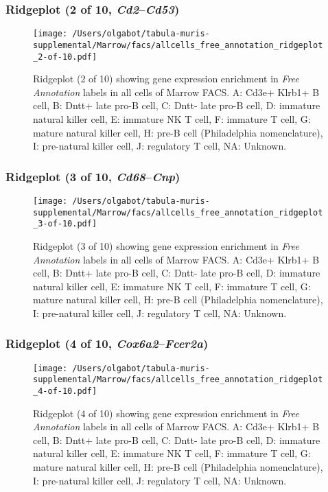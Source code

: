 \clearpage

\subsubsection{Ridgeplot (2 of 10, \emph{Cd2}--\emph{Cd53})}
\begin{figure}[h]
\centering
\texttt{[image: /Users/olgabot/tabula-muris-supplemental/Marrow/facs/allcells\_free\_annotation\_ridgeplot\_2-of-10.pdf]}

\caption{ Ridgeplot (2 of 10)  showing gene expression enrichment in \emph{Free Annotation} labels in all cells of Marrow FACS. A: Cd3e+ Klrb1+ B cell, B: Dntt+ late pro-B cell, C: Dntt- late pro-B cell, D: immature natural killer cell, E: immature NK T cell, F: immature T cell, G: mature natural killer cell, H: pre-B cell (Philadelphia nomenclature), I: pre-natural killer cell, J: regulatory T cell, NA: Unknown.}
\end{figure}


\clearpage

\subsubsection{Ridgeplot (3 of 10, \emph{Cd68}--\emph{Cnp})}
\begin{figure}[h]
\centering
\texttt{[image: /Users/olgabot/tabula-muris-supplemental/Marrow/facs/allcells\_free\_annotation\_ridgeplot\_3-of-10.pdf]}

\caption{ Ridgeplot (3 of 10)  showing gene expression enrichment in \emph{Free Annotation} labels in all cells of Marrow FACS. A: Cd3e+ Klrb1+ B cell, B: Dntt+ late pro-B cell, C: Dntt- late pro-B cell, D: immature natural killer cell, E: immature NK T cell, F: immature T cell, G: mature natural killer cell, H: pre-B cell (Philadelphia nomenclature), I: pre-natural killer cell, J: regulatory T cell, NA: Unknown.}
\end{figure}


\clearpage

\subsubsection{Ridgeplot (4 of 10, \emph{Cox6a2}--\emph{Fcer2a})}
\begin{figure}[h]
\centering
\texttt{[image: /Users/olgabot/tabula-muris-supplemental/Marrow/facs/allcells\_free\_annotation\_ridgeplot\_4-of-10.pdf]}

\caption{ Ridgeplot (4 of 10)  showing gene expression enrichment in \emph{Free Annotation} labels in all cells of Marrow FACS. A: Cd3e+ Klrb1+ B cell, B: Dntt+ late pro-B cell, C: Dntt- late pro-B cell, D: immature natural killer cell, E: immature NK T cell, F: immature T cell, G: mature natural killer cell, H: pre-B cell (Philadelphia nomenclature), I: pre-natural killer cell, J: regulatory T cell, NA: Unknown.}
\end{figure}


